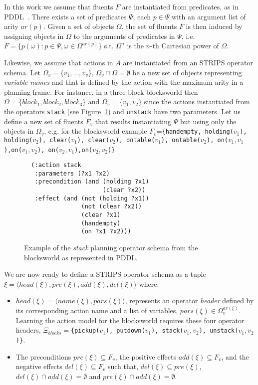 \documentclass[letterpaper]{article} %
\newcommand{\tup}[1]{{\langle #1 \rangle}}
\begin{document}
In this work we assume that fluents $F$ are instantiated from predicates, as in PDDL~\cite{mcdermott1998pddl,fox2003pddl2}. There exists a set of predicates $\Psi$, each $p\in\Psi$ with an argument list of arity $ar(p)$. Given a set of objects $\Omega$, the set of fluents $F$ is then induced by assigning objects in $\Omega$ to the arguments of predicates in $\Psi$, i.e.~$F=\{p(\omega):p\in\Psi,\omega\in\Omega^{ar(p)}\}$ s.t. $\Omega^n$ is the $n$-th Cartesian power of $\Omega$.

Likewise, we assume that actions in $A$ are instantiated from an STRIPS operator schema. Let $\Omega_v=\{v_1,\ldots,v_v\}$, $\Omega_v\cap\Omega=\emptyset$ be a new set of objects representing {\em variable names} and that is defined by the action with the maximum arity in a planning frame. For instance, in a three-block blocksworld then $\Omega=\{block_1, block_2, block_3\}$ and $\Omega_v=\{v_1, v_2\}$ since the actions instantiated from the operators {\small\tt stack} (see Figure~\ref{fig:stack}) and {\small\tt unstack} have two parameters. Let us define a new set of fluents $F_{v}$ that results instantiating $\Psi$ but using only the objects in $\Omega_v$, e.g. for the blocksworld example $F_v$={\small\tt\{handempty, holding($v_1$), holding($v_2$), clear($v_1$), clear($v_2$), ontable($v_1$), ontable($v_2$), on($v_1,v_1$),on($v_1,v_2$), on($v_2,v_1$),on($v_2,v_2$)\}}.

\begin{figure}[hbt]
\begin{footnotesize}
\begin{scriptsize}
\begin{verbatim}
  (:action stack
   :parameters (?x1 ?x2)
   :precondition (and (holding ?x1) 
                      (clear ?x2))
   :effect (and (not (holding ?x1))
                (not (clear ?x2))
                (clear ?x1)
                (handempty)
                (on ?x1 ?x2)))
\end{verbatim}
\end{scriptsize}
\end{footnotesize}
 \caption{\small Example of the {\em stack} planning operator schema from the blocksworld as represented in PDDL.}
\label{fig:stack}
\end{figure}

We are now ready to define a STRIPS operator schema as a tuple $\xi=\tup{head(\xi),pre(\xi),add(\xi),del(\xi)}$ where:
\begin{itemize}
\item $head(\xi)=\tup{name(\xi),pars(\xi)}$, represents an operator {\em header} defined by its corresponding action name and a list of variables, $pars(\xi)\in\Omega_v^{ar(\xi)}$. Learning the action model for the blocksworld requires these four operator headers, $\Xi_{blocks}=${\small\tt\{pickup($v_1$), putdown($v_1$), stack($v_1,v_2$), unstack($v_1,v_2$)\}}.
\item The preconditions $pre(\xi)\subseteq F_v$, the positive effects $add(\xi)\subseteq F_v$, and the negative effects $del(\xi)\subseteq F_v$ such that, $del(\xi)\subseteq pre(\xi)$, $del(\xi)\cap add(\xi)=\emptyset$ and $pre(\xi)\cap add(\xi)=\emptyset$.
\end{itemize}
\end{document}
